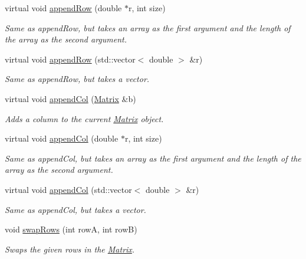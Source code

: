 \begin{DoxyCompactItemize}
virtual void \hyperlink{class_matrix_a55104cb3fcf93a887ac713955fc0f5c9}{appendRow} (double $\ast$r, int size)
\begin{DoxyCompactList}\small\item\em Same as appendRow, but takes an array as the first argument and the length of the array as the second argument. \item\end{DoxyCompactList}\item 
virtual void \hyperlink{class_matrix_a934b0686d9a2b971e9740b9a29224a54}{appendRow} (std::vector$<$ double $>$ \&r)
\begin{DoxyCompactList}\small\item\em Same as appendRow, but takes a vector. \item\end{DoxyCompactList}\item 
virtual void \hyperlink{class_matrix_a6d7061bb02cf34f6c79a01ff25b41e84}{appendCol} (\hyperlink{class_matrix}{Matrix} \&b)
\begin{DoxyCompactList}\small\item\em Adds a column to the current \hyperlink{class_matrix}{Matrix} object. \item\end{DoxyCompactList}\item 
virtual void \hyperlink{class_matrix_aae8efe9de26740e3c953e43de55963b2}{appendCol} (double $\ast$r, int size)
\begin{DoxyCompactList}\small\item\em Same as appendCol, but takes an array as the first argument and the length of the array as the second argument. \item\end{DoxyCompactList}\item 
virtual void \hyperlink{class_matrix_a726f7ae83284c090af821752628974af}{appendCol} (std::vector$<$ double $>$ \&r)
\begin{DoxyCompactList}\small\item\em Same as appendCol, but takes a vector. \item\end{DoxyCompactList}\item 
void \hyperlink{class_matrix_ac0e73d5e98817e12b82a3f626c8343de}{swapRows} (int rowA, int rowB)
\begin{DoxyCompactList}\small\item\em Swaps the given rows in the \hyperlink{class_matrix}{Matrix}. \item\end{DoxyCompactList}\item 

\end{DoxyCompactItemize}
